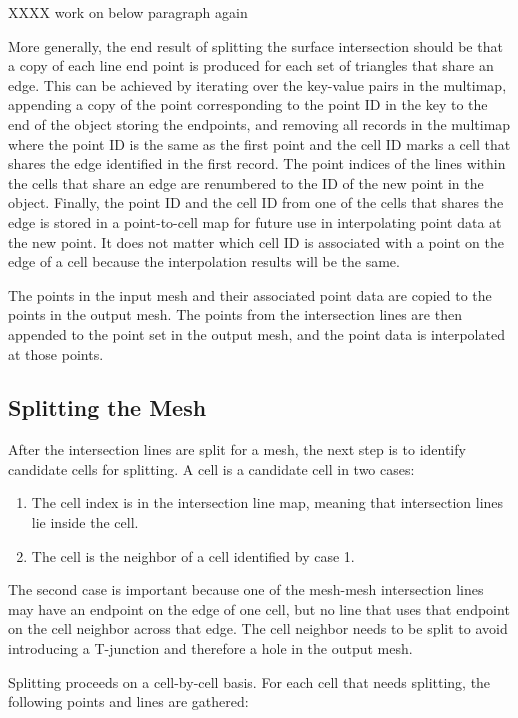 \documentclass{InsightArticle}
\begin{document}
XXXX work on below paragraph again

More generally, the end result of splitting the surface intersection should be that a copy of each line end point is produced for each set of triangles that share an edge. This can be achieved by iterating over the key-value pairs in the multimap, appending a copy of the point corresponding to the point ID in the key to the end of the  object storing the endpoints, and removing all records in the multimap where the point ID is the same as the first point and the cell ID marks a cell that shares the edge identified in the first record. The point indices of the lines within the cells that share an edge are renumbered to the ID of the new point in the  object. Finally, the point ID and the cell ID from one of the cells that shares the edge is stored in a point-to-cell map for future use in interpolating point data at the new point. It does not matter which cell ID is associated with a point on the edge of a cell because the interpolation results will be the same.

The points in the input mesh and their associated point data are copied to the points in the output mesh. The points from the intersection lines are then appended to the point set in the output mesh, and the point data is interpolated at those points. 

\subsection{Splitting the Mesh}

After the intersection lines are split for a mesh, the next step is to identify candidate cells for splitting. A cell is a candidate cell in two cases:

\begin{enumerate}
\item The cell index is in the intersection line map, meaning that intersection lines lie inside the cell.
\item The cell is the neighbor of a cell identified by case 1.
\end{enumerate}

The second case is important because one of the mesh-mesh intersection lines may have an endpoint on the edge of one cell, but no line that uses that endpoint on the cell neighbor across that edge. The cell neighbor needs to be split to avoid introducing a T-junction and therefore a hole in the output mesh.

Splitting proceeds on a cell-by-cell basis. For each cell that needs splitting, the following points and lines are gathered:
\end{document}
